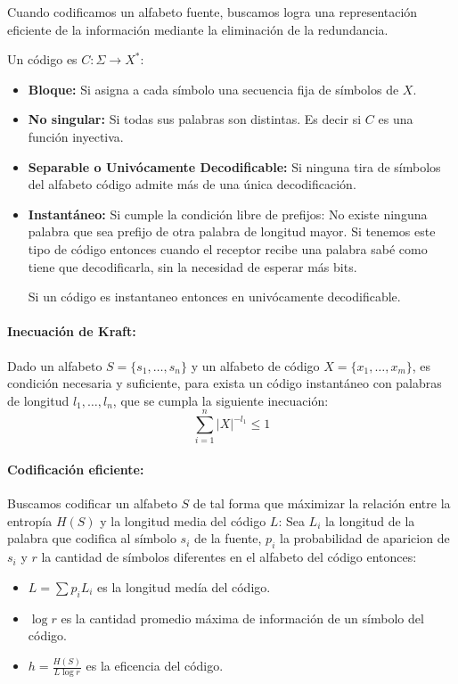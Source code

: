 \documentclass[10pt,a4paper]{article}
\begin{document}
Cuando codificamos un alfabeto fuente, buscamos logra una representación eficiente de la información mediante la eliminación de la redundancia.

Un código es \(C:\Sigma\to X^*\):
\begin{itemize}
  \item \textbf{Bloque:} Si asigna a cada símbolo una secuencia fija  de símbolos de \(X\).
  \item \textbf{No singular:} Si todas sus palabras son distintas. Es decir si \(C\) es una función inyectiva.
  \item \textbf{Separable o Univócamente Decodificable:} Si ninguna tira de símbolos del alfabeto código admite más de una única decodificación.
  \item \textbf{Instantáneo:} Si cumple la condición libre de prefijos: No existe ninguna palabra que sea prefijo de otra palabra de longitud mayor. Si tenemos este tipo de código entonces cuando el receptor recibe una palabra sabé como tiene que decodificarla, sin la necesidad de esperar más bits.
  
  Si un código es instantaneo entonces en univócamente decodificable. 
\end{itemize}

\paragraph{Inecuación de Kraft:} Dado un alfabeto \(S = \{s_1,\dots,s_n\}\) y un alfabeto de código \(X=\{x_1,\dots,x_m\}\), es condición necesaria y suficiente, para exista un código instantáneo con palabras de longitud \(l_1,\dots,l_{n}\), que se cumpla la siguiente inecuación:
\[\sum_{i=1}^n |X|^{-l_1}\leq 1\]
\paragraph{Codificación eficiente:} Buscamos codificar un alfabeto \(S\) de tal forma que máximizar la relación entre la entropía \(H(S)\) y la longitud media del código \(L\):  Sea \(L_i\) la longitud de la palabra que codifica al símbolo \(s_i\) de la fuente, \(p_i\) la probabilidad de aparicion de \(s_i\) y \(r\) la cantidad de símbolos diferentes en el alfabeto del código entonces:

\begin{itemize}
  \item \(L = \sum p_iL_i \) es la longitud medía del código.
  \item \(\log r\) es la cantidad promedio máxima de información de un símbolo del código.
  \item \(h = \frac{H(S)}{L\log r}\) es la eficencia del código.
\end{itemize}
\end{document}
